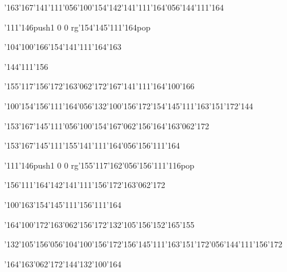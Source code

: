 \null\vfill\ipa\centerline{\enskip\enskip\enskip\enskip\char'163\char'167\char'141\char'111\char'056\char'100\char'154\enskip\char'142\char'141\char'111\char'164\char'056\char'144\char'111\char'164}\medskip\centerline{\enskip\char'111\char'146\enskip\pdfcolorstack\match push{1 0 0 rg}\char'154\char'145\char'111\char'164\pdfcolorstack\match pop{}\enskip\enskip\enskip\enskip\enskip\enskip\enskip}\medskip\centerline{\enskip\enskip\char'104\char'100\char'166\enskip\enskip\char'154\char'141\char'111\char'164\char'163\enskip\enskip\enskip\enskip\enskip\enskip\enskip}\medskip\centerline{\enskip\enskip\enskip\enskip\enskip\enskip\enskip\enskip\enskip\enskip\enskip\char'144\char'111\char'156}\medskip\centerline{\enskip\enskip\enskip\enskip\enskip\char'155\char'117\char'156\char'172\enskip\enskip\char'163\char'062\char'172\enskip\char'167\char'141\char'111\enskip\enskip\enskip\char'164\char'100\char'166}\medskip\centerline{\enskip\char'100\char'154\enskip\char'156\char'111\char'164\char'056\char'132\char'100\char'156\char'172\enskip\char'154\char'145\char'111\enskip\enskip\enskip\enskip\char'163\char'151\char'172\char'144}\medskip\centerline{\enskip\char'153\char'167\char'145\char'111\char'056\char'100\char'154\enskip\enskip\enskip\enskip\enskip\enskip\enskip\enskip\enskip\enskip\char'167\char'062\char'156\enskip\char'164\char'163\char'062\char'172}\medskip\vfill\footline{\hfil\tt\folio\hfil}\eject
\null\vfill\ipa\centerline{\enskip\enskip\enskip\enskip\char'153\char'167\char'145\char'111\enskip\enskip\enskip\enskip\char'155\char'141\char'111\char'164\char'056\char'156\char'111\char'164}\medskip\centerline{\enskip\char'111\char'146\enskip\enskip\enskip\enskip\enskip\enskip\pdfcolorstack\match push{1 0 0 rg}\char'155\char'117\char'162\char'056\char'156\char'111\char'116\pdfcolorstack\match pop{}}\medskip\centerline{\enskip\enskip\char'156\char'111\char'164\enskip\enskip\char'142\char'141\char'111\char'156\char'172\enskip\enskip\enskip\enskip\char'163\char'062\char'172}\medskip\centerline{\enskip\char'100\char'163\enskip\char'154\char'145\char'111\enskip\enskip\enskip\enskip\char'156\char'111\char'164}\medskip\centerline{\enskip\char'164\char'100\char'172\enskip\char'163\char'062\char'156\char'172\enskip\enskip\char'132\char'105\char'156\enskip\enskip\enskip\enskip\enskip\enskip\enskip\char'152\char'165\char'155}\medskip\centerline{\enskip\enskip\enskip\enskip\char'132\char'105\char'156\char'056\char'104\char'100\char'156\char'172\enskip\char'156\char'145\char'111\enskip\char'163\char'151\char'172\char'056\char'144\char'111\char'156\char'172}\medskip\centerline{\enskip\enskip\enskip\enskip\enskip\enskip\enskip\enskip\enskip\enskip\enskip\enskip\enskip\char'164\char'163\char'062\char'172\enskip\enskip\enskip\enskip\enskip\char'144\char'132\char'100\char'164}\medskip\vfill\footline{\hfil\tt\folio\hfil}\eject
